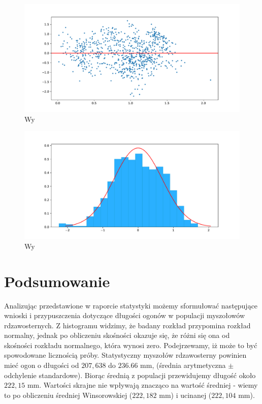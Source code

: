 \documentclass{article}
\theoremstyle{break}
\begin{document}
\begin{figure}[H]
	\begin{center}
		\includegraphics[scale=0.43]{res.pdf}
		\caption{Wy}
		\label{fig:res}
	\end{center}
\end{figure}

\begin{figure}[H]
	\begin{center}
		\includegraphics[scale=0.43]{res_hist.pdf}
		\caption{Wy}
		\label{fig:res_hist}
	\end{center}
\end{figure}

	
\section{Podsumowanie}
	Analizując przedstawione w raporcie statystyki możemy sformułować następujące wnioski i przypuszczenia dotyczące długości ogonów w populacji myszołowów rdzawosternych. Z histogramu widzimy, że badany rozkład przypomina rozkład normalny, jednak po obliczeniu skośności okazuje się, że różni się ona od skośności rozkładu normalnego, która wynosi zero. Podejrzewamy, iż może to być spowodowane licznością próby. Statystyczny myszołów rdzawosterny powinien mieć ogon o długości od $207,638$ do $236.66$ mm, (średnia arytmetyczna $\pm$ odchylenie standardowe). Biorąc średnią z populacji przewidujemy długość około $222,15$ mm. Wartości skrajne nie wpływają znacząco na wartość średniej - wiemy to po obliczeniu średniej Winsorowskiej ($222,182$ mm) i ucinanej ($222,104$ mm). 
	
\end{document}
